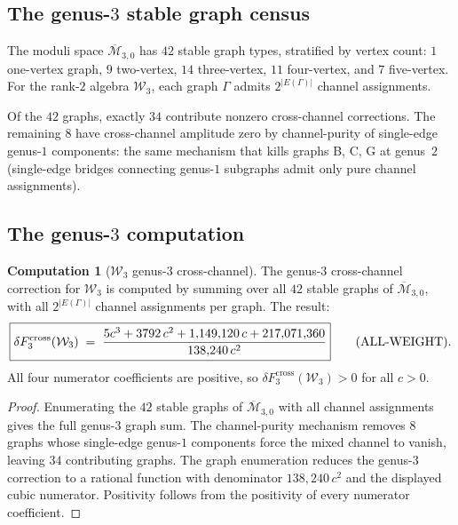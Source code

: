 \documentclass[11pt]{article}
\theoremstyle{definition}
\newtheorem{computation}[theorem]{Computation}
\theoremstyle{remark}
\newcommand{\cM}{\mathcal{M}}
\newcommand{\Walg}{\mathcal{W}}
\newcommand{\cross}{\mathrm{cross}}
\numberwithin{equation}{section}
\begin{document}
\subsection{The genus-$3$ stable graph census}

The moduli space $\overline{\cM}_{3,0}$ has $42$ stable
graph types, stratified by vertex count:
$1$ one-vertex graph, $9$ two-vertex, $14$ three-vertex,
$11$ four-vertex, and $7$ five-vertex.
For the rank-$2$ algebra $\Walg_3$, each graph $\Gamma$
admits $2^{|E(\Gamma)|}$ channel assignments.

Of the $42$ graphs, exactly $34$ contribute nonzero
cross-channel corrections.
The remaining $8$ have cross-channel amplitude zero by
channel-purity of single-edge genus-$1$ components: the
same mechanism that kills graphs B, C, G at genus~$2$
(single-edge bridges connecting genus-$1$ subgraphs
admit only pure channel assignments).

\subsection{The genus-$3$ computation}

\begin{computation}[$\Walg_3$ genus-$3$ cross-channel]\label{comp:w3-genus3}
The genus-$3$ cross-channel correction for $\Walg_3$ is
computed by summing over all $42$ stable graphs
of $\overline{\cM}_{3,0}$, with all $2^{|E(\Gamma)|}$
channel assignments per graph.
The result:
\begin{equation}\label{eq:w3-genus3-result}
\boxed{
 \delta F_3^{\cross}(\Walg_3)
 \;=\;
 \frac{5c^3 + 3792\, c^2
 + 1{,}149{,}120\, c
 + 217{,}071{,}360}{138{,}240\, c^2}
}
\qquad\text{\textup{(}ALL-WEIGHT\textup{)}}.
\end{equation}
All four numerator coefficients are positive, so
$\delta F_3^{\cross}(\Walg_3) > 0$ for all $c > 0$.
\end{computation}

\begin{proof}
Enumerating the $42$ stable graphs of
$\overline{\cM}_{3,0}$ with all channel assignments gives the
full genus-$3$ graph sum.
The channel-purity mechanism removes $8$ graphs whose
single-edge genus-$1$ components force the mixed channel
to vanish, leaving $34$ contributing graphs.
The graph enumeration reduces the genus-$3$ correction to a rational
function with denominator $138{,}240\,c^2$ and the displayed cubic
numerator.
Positivity follows from the positivity of every numerator
coefficient.
\end{proof}
\end{document}
